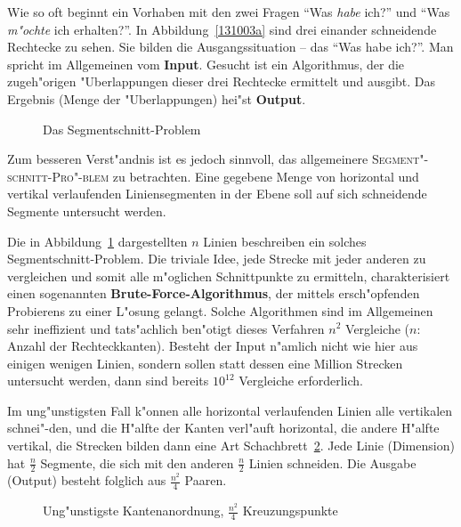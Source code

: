 \documentclass[draft,12pt]{scrreprt}
\theoremstyle{break}
\begin{document}
Wie so oft beginnt ein Vorhaben mit den zwei Fragen "`Was \emph{habe}
ich?"' und "`Was \emph{m"ochte} ich erhalten?"'. In Abbildung~\ref{131003a}
sind drei einander schneidende Rechtecke zu sehen. Sie bilden die
Ausgangssituation -- das "`Was habe ich?"'. Man spricht im Allgemeinen vom
\textbf{Input}. Gesucht ist ein Algorithmus, der die zugeh"origen
"Uberlappungen dieser drei Rechtecke ermittelt und ausgibt. Das Ergebnis (Menge der "Uberlappungen)
hei"st \textbf{Output}.

\begin{figure}
  \begin{center}\end{center}
  \caption{Das Segmentschnitt-Problem}
  \label{131003b}
\end{figure}

Zum besseren Verst"andnis ist es jedoch sinnvoll, das allgemeinere
\textsc{Segment"-schnitt-Pro"-blem} zu betrachten. Eine
gegebene Menge von horizontal und vertikal verlaufenden Liniensegmenten
in der Ebene soll auf sich schneidende Segmente untersucht werden.

Die in Abbildung~\ref{131003b} dargestellten $n$ Linien beschreiben ein
solches Segmentschnitt-Problem. Die triviale Idee, jede Strecke mit jeder
anderen zu vergleichen und somit alle m"oglichen Schnittpunkte zu
ermitteln, charakterisiert einen sogenannten
\textbf{Brute-Force-Algorithmus}, der mittels ersch"opfenden Probierens zu
einer L"osung gelangt. Solche Algorithmen sind im Allgemeinen sehr
ineffizient und tats"achlich ben"otigt dieses Verfahren $n^2$ Vergleiche
($n$: Anzahl der Rechteckkanten). Besteht der Input n"amlich nicht wie
hier aus einigen wenigen Linien, sondern sollen statt dessen eine Million
Strecken untersucht werden, dann sind bereits $10^{12}$ Vergleiche
erforderlich.

Im ung"unstigsten Fall k"onnen alle horizontal verlaufenden Linien
alle vertikalen schnei"-den, und die H"alfte der Kanten verl"auft
horizontal, die andere H"alfte vertikal, die Strecken bilden dann eine
Art Schachbrett~\ref{131003c}. Jede Linie (Dimension) hat $\frac{n}{2}$ Segmente,
die sich mit den anderen $\frac{n}{2}$ Linien schneiden.  Die Ausgabe
(Output) besteht folglich aus $\frac{n^2}{4}$ Paaren. 

\begin{figure}
  \begin{center}\end{center}
  \caption{Ung"unstigste Kantenanordnung, $\frac{n^2}{4}$ Kreuzungspunkte}
  \label{131003c}
\end{figure}
\end{document}
